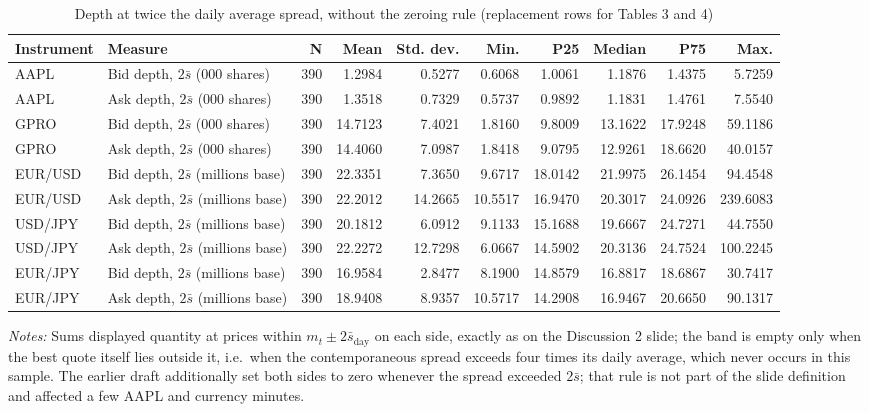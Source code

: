 
\begin{table}[htbp]
\centering
\caption{Depth at twice the daily average spread, without the zeroing rule (replacement rows for Tables 3 and 4)}
\label{tab:band_depth_corrected}
\footnotesize
\begin{tabular}{llrrrrrrrr}
\toprule
Instrument & Measure & N & Mean & Std. dev. & Min. & P25 & Median & P75 & Max. \\
\midrule
AAPL & Bid depth, $2\bar s$ (000 shares) & 390 & 1.2984 & 0.5277 & 0.6068 & 1.0061 & 1.1876 & 1.4375 & 5.7259 \\
AAPL & Ask depth, $2\bar s$ (000 shares) & 390 & 1.3518 & 0.7329 & 0.5737 & 0.9892 & 1.1831 & 1.4761 & 7.5540 \\
GPRO & Bid depth, $2\bar s$ (000 shares) & 390 & 14.7123 & 7.4021 & 1.8160 & 9.8009 & 13.1622 & 17.9248 & 59.1186 \\
GPRO & Ask depth, $2\bar s$ (000 shares) & 390 & 14.4060 & 7.0987 & 1.8418 & 9.0795 & 12.9261 & 18.6620 & 40.0157 \\
EUR/USD & Bid depth, $2\bar s$ (millions base) & 390 & 22.3351 & 7.3650 & 9.6717 & 18.0142 & 21.9975 & 26.1454 & 94.4548 \\
EUR/USD & Ask depth, $2\bar s$ (millions base) & 390 & 22.2012 & 14.2665 & 10.5517 & 16.9470 & 20.3017 & 24.0926 & 239.6083 \\
USD/JPY & Bid depth, $2\bar s$ (millions base) & 390 & 20.1812 & 6.0912 & 9.1133 & 15.1688 & 19.6667 & 24.7271 & 44.7550 \\
USD/JPY & Ask depth, $2\bar s$ (millions base) & 390 & 22.2272 & 12.7298 & 6.0667 & 14.5902 & 20.3136 & 24.7524 & 100.2245 \\
EUR/JPY & Bid depth, $2\bar s$ (millions base) & 390 & 16.9584 & 2.8477 & 8.1900 & 14.8579 & 16.8817 & 18.6867 & 30.7417 \\
EUR/JPY & Ask depth, $2\bar s$ (millions base) & 390 & 18.9408 & 8.9357 & 10.5717 & 14.2908 & 16.9467 & 20.6650 & 90.1317 \\
\bottomrule
\end{tabular}

\begin{minipage}{0.95\linewidth}\footnotesize\emph{Notes:} Sums displayed quantity at prices within $m_t \pm 2\bar s_{\text{day}}$ on each side, exactly as on the Discussion 2 slide; the band is empty only when the best quote itself lies outside it, i.e.\ when the contemporaneous spread exceeds four times its daily average, which never occurs in this sample. The earlier draft additionally set both sides to zero whenever the spread exceeded $2\bar s$; that rule is not part of the slide definition and affected a few AAPL and currency minutes.\end{minipage}
\end{table}


